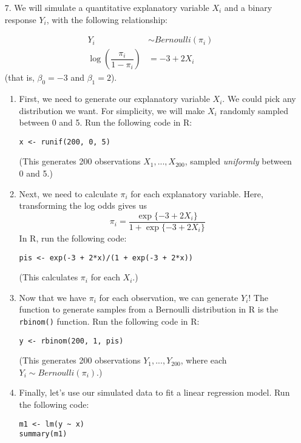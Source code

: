 \documentclass[11pt]{article}
\begin{document}
\begin{enumerate}
\item[7.] We will simulate a quantitative explanatory variable $X_i$ and a binary response $Y_i$, with the following relationship:

\begin{align*}
Y_i &\sim Bernoulli(\pi_i) \\
\log \left( \dfrac{\pi_i}{1 - \pi_i} \right) &= -3 + 2 X_i
\end{align*}
(that is, $\beta_0 = -3$ and $\beta_1 = 2$).

\begin{enumerate}
\item First, we need to generate our explanatory variable $X_i$. We could pick any distribution we want. For simplicity, we will make $X_i$ randomly sampled between 0 and 5. Run the following code in R:
\begin{verbatim}
x <- runif(200, 0, 5)
\end{verbatim}
(This generates 200 observations $X_1,...,X_{200}$, sampled \textit{uniformly} between 0 and 5.)

\item Next, we need to calculate $\pi_i$ for each explanatory variable. Here, transforming the log odds gives us
$$\pi_i = \dfrac{\exp\{-3 + 2 X_i\}}{1 + \exp\{-3 + 2 X_i\}}$$
In R, run the following code:

\begin{verbatim}
pis <- exp(-3 + 2*x)/(1 + exp(-3 + 2*x))
\end{verbatim}

(This calculates $\pi_i$ for each $X_i$.)

\item Now that we have $\pi_i$ for each observation, we can generate $Y_i$! The function to generate samples from a Bernoulli distribution in R is the \verb;rbinom(); function. Run the following code in R:

\begin{verbatim}
y <- rbinom(200, 1, pis)
\end{verbatim}

(This generates 200 observations $Y_1,...,Y_{200}$, where each $Y_i \sim Bernoulli(\pi_i)$.) 

\item Finally, let's use our simulated data to fit a linear regression model. Run the following code:

\begin{verbatim}
m1 <- lm(y ~ x) 
summary(m1)
\end{verbatim}


\end{enumerate}
\end{enumerate}
\end{document}
